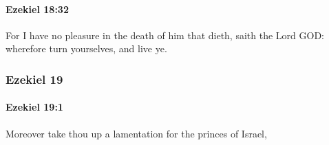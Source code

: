 		\paragraph{Ezekiel 18:32} %
			\label{EZEKIEL-18-32}

			For I have no pleasure in the death of him that dieth, saith the Lord GOD: wherefore turn yourselves, and live ye.

	\subsubsection{Ezekiel 19} %
		\label{EZEKIEL-19}

		\paragraph{Ezekiel 19:1} %
			\label{EZEKIEL-19-1}

			Moreover take thou up a lamentation for the princes of Israel,

